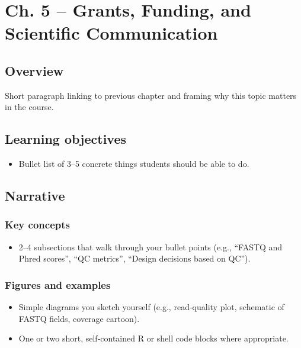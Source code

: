 \documentclass[
  letterpaper,
  DIV=11,
  numbers=noendperiod]{scrreprt}
\providecommand{\tightlist}{%
  \setlength{\itemsep}{0pt}\setlength{\parskip}{0pt}}
\begin{document}

\chapter{Ch. 5 -- Grants, Funding, and Scientific
Communication}\label{ch.-5-grants-funding-and-scientific-communication}

\section{Overview}\label{overview-1}

Short paragraph linking to previous chapter and framing why this topic
matters in the course.

\section{Learning objectives}\label{learning-objectives-1}

\begin{itemize}
\tightlist
\item
  Bullet list of 3--5 concrete things students should be able to do.
\end{itemize}

\section{Narrative}\label{narrative-1}

\subsection{Key concepts}\label{key-concepts-1}

\begin{itemize}
\tightlist
\item
  2--4 subsections that walk through your bullet points (e.g., ``FASTQ
  and Phred scores'', ``QC metrics'', ``Design decisions based on QC'').
\end{itemize}

\subsection{Figures and examples}\label{figures-and-examples-1}

\begin{itemize}
\tightlist
\item
  Simple diagrams you sketch yourself (e.g., read‑quality plot,
  schematic of FASTQ fields, coverage cartoon).
\item
  One or two short, self‑contained R or shell code blocks where
  appropriate.
\end{itemize}
\end{document}

